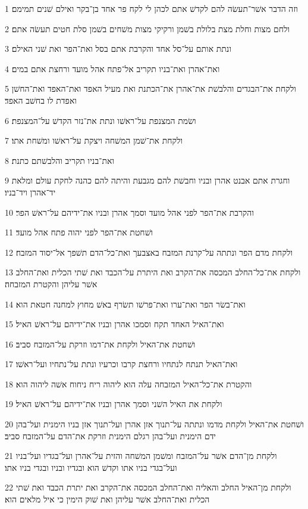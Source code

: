\par 1 וזה הדבר אשׁר־תעשׂה להם לקדשׁ אתם לכהן לי לקח פר אחד בן־בקר ואילם שׁנים תמימם׃
\par 2 ולחם מצות וחלת מצת בלולת בשׁמן ורקיקי מצות משׁחים בשׁמן סלת חטים תעשׂה אתם׃
\par 3 ונתת אותם על־סל אחד והקרבת אתם בסל ואת־הפר ואת שׁני האילם׃
\par 4 ואת־אהרן ואת־בניו תקריב אל־פתח אהל מועד ורחצת אתם במים׃
\par 5 ולקחת את־הבגדים והלבשׁת את־אהרן את־הכתנת ואת מעיל האפד ואת־האפד ואת־החשׁן ואפדת לו בחשׁב האפד׃
\par 6 ושׂמת המצנפת על־ראשׁו ונתת את־נזר הקדשׁ על־המצנפת׃
\par 7 ולקחת את־שׁמן המשׁחה ויצקת על־ראשׁו ומשׁחת אתו׃
\par 8 ואת־בניו תקריב והלבשׁתם כתנת׃
\par 9 וחגרת אתם אבנט אהרן ובניו וחבשׁת להם מגבעת והיתה להם כהנה לחקת עולם ומלאת יד־אהרן ויד־בניו׃
\par 10 והקרבת את־הפר לפני אהל מועד וסמך אהרן ובניו את־ידיהם על־ראשׁ הפר׃
\par 11 ושׁחטת את־הפר לפני יהוה פתח אהל מועד׃
\par 12 ולקחת מדם הפר ונתתה על־קרנת המזבח באצבעך ואת־כל־הדם תשׁפך אל־יסוד המזבח׃
\par 13 ולקחת את־כל־החלב המכסה את־הקרב ואת היתרת על־הכבד ואת שׁתי הכלית ואת־החלב אשׁר עליהן והקטרת המזבחה׃
\par 14 ואת־בשׂר הפר ואת־ערו ואת־פרשׁו תשׂרף באשׁ מחוץ למחנה חטאת הוא׃
\par 15 ואת־האיל האחד תקח וסמכו אהרן ובניו את־ידיהם על־ראשׁ האיל׃
\par 16 ושׁחטת את־האיל ולקחת את־דמו וזרקת על־המזבח סביב׃
\par 17 ואת־האיל תנתח לנתחיו ורחצת קרבו וכרעיו ונתת על־נתחיו ועל־ראשׁו׃
\par 18 והקטרת את־כל־האיל המזבחה עלה הוא ליהוה ריח ניחוח אשׁה ליהוה הוא׃
\par 19 ולקחת את האיל השׁני וסמך אהרן ובניו את־ידיהם על־ראשׁ האיל׃
\par 20 ושׁחטת את־האיל ולקחת מדמו ונתתה על־תנוך אזן אהרן ועל־תנוך אזן בניו הימנית ועל־בהן ידם הימנית ועל־בהן רגלם הימנית וזרקת את־הדם על־המזבח סביב׃
\par 21 ולקחת מן־הדם אשׁר על־המזבח ומשׁמן המשׁחה והזית על־אהרן ועל־בגדיו ועל־בניו ועל־בגדי בניו אתו וקדשׁ הוא ובגדיו ובניו ובגדי בניו אתו׃
\par 22 ולקחת מן־האיל החלב והאליה ואת־החלב המכסה את־הקרב ואת יתרת הכבד ואת שׁתי הכלית ואת־החלב אשׁר עליהן ואת שׁוק הימין כי איל מלאים הוא׃
